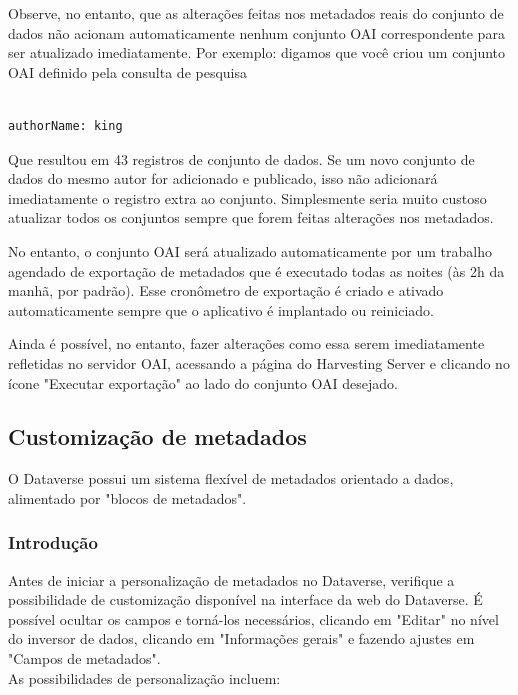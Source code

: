 \documentclass[12pt,hidelinks]{article}
\begin{document}
Observe, no entanto, que as alterações feitas nos metadados reais do conjunto de dados não acionam automaticamente nenhum conjunto OAI correspondente para ser atualizado imediatamente. Por exemplo: digamos que você criou um conjunto OAI definido pela consulta de pesquisa

\begin{verbatim}

authorName: king 

\end{verbatim}

Que resultou em 43 registros de conjunto de dados. Se um novo conjunto de dados do mesmo autor for adicionado e publicado, isso não adicionará imediatamente o registro extra ao conjunto. Simplesmente seria muito custoso atualizar todos os conjuntos sempre que forem feitas alterações nos metadados.

No entanto, o conjunto OAI será atualizado automaticamente por um trabalho agendado de exportação de metadados que é executado todas as noites (às 2h da manhã, por padrão). Esse cronômetro de exportação é criado e ativado automaticamente sempre que o aplicativo é implantado ou reiniciado.

Ainda é possível, no entanto, fazer alterações como essa serem imediatamente refletidas no servidor OAI, acessando a página do Harvesting Server e clicando no ícone "Executar exportação" ao lado do conjunto OAI desejado.

\subsection{Customização de metadados}

\qquad  O Dataverse possui um sistema flexível de metadados orientado a dados, alimentado por "blocos de metadados".

\subsubsection{Introdução}

\qquad Antes de iniciar a personalização de metadados no Dataverse, verifique a possibilidade de customização disponível na interface da web do Dataverse. É possível ocultar os campos e torná-los necessários, clicando em "Editar" no nível do inversor de dados, clicando em "Informações gerais" e fazendo ajustes em "Campos de metadados".\\

As possibilidades de personalização incluem:
\end{document}
